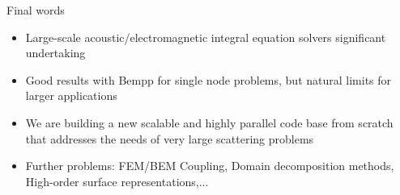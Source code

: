 \documentclass[dvipsnames,10pt]{beamer}
\begin{document}
	

\begin{frame}{Final words}
	
	\begin{itemize}
		\item Large-scale acoustic/electromagnetic integral equation solvers significant undertaking
		\item Good results with Bempp for single node problems, but natural limits for larger applications
		\item We are building a new scalable and highly parallel code base from scratch that addresses the
		needs of very large scattering problems
		\item Further problems: FEM/BEM Coupling, Domain decomposition methods, High-order surface
		      representations,...
		
		
	\end{itemize}
	
	
	\end{frame}
\end{document}
